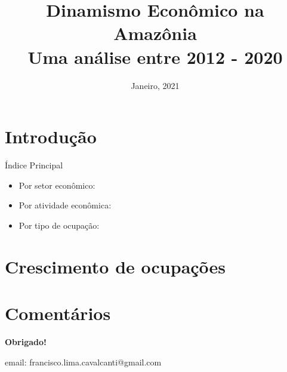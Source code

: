 \documentclass[10pt]{beamer}
\date{Janeiro, 2021}
\title{Dinamismo Econômico na Amazônia \\ Uma análise entre 2012 - 2020}
\begin{document}

\begin{frame}
\titlepage
\end{frame}


\section{Introdução}

\begin{frame}[label=indice_principal]{Índice Principal}


\begin{itemize}
\item{Por setor econômico: \hyperlink{table1taxadecrescimentondeocupadosporsetor}{}}
\item{Por atividade econômica: \hyperlink{table1taxadecrescimentondeocupadosporatividade}{}}
\item{Por tipo de ocupação: \hyperlink{table1taxadecrescimentondeocupadosportipodeocupacao}{}}

\end{itemize}


\end{frame}

\section{Crescimento de ocupações}

\begin{frame}
\textit{\hyperlink{indice_principal}{}}

\end{frame}


\begin{frame}
\textit{\hyperlink{indice_principal}{}}

\end{frame}


\begin{frame}
\textit{\hyperlink{indice_principal}{}}

\end{frame}



\section{Comentários}


\frame
{
\begin{center}
	\vfill
	\textbf{Obrigado!}
	\\

	\begin{small}
	email: francisco.lima.cavalcanti@gmail.com
	\end{small}
	\vfill     
\end{center}
}
\end{document}
